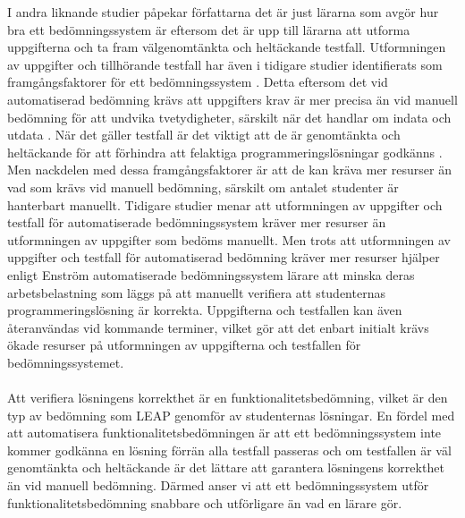 \documentclass[a4paper,11pt]{article}
\begin{document}
{I andra liknande studier \cite{pieterse} \cite{ala-mutka} \cite{enstrom} påpekar författarna det är just lärarna som avgör hur bra ett bedömningssystem är eftersom det är upp till lärarna att utforma uppgifterna och ta fram välgenomtänkta och heltäckande testfall. Utformningen av uppgifter och tillhörande testfall har även i tidigare studier identifierats som framgångsfaktorer för ett bedömningssystem \cite{hundley-britt-2009} \cite{pieterse}. Detta eftersom det vid automatiserad bedömning krävs att uppgifters krav är mer precisa än vid manuell bedömning för att undvika tvetydigheter, särskilt när det handlar om indata och utdata \cite{douce_11}. När det gäller testfall är det viktigt att de är genomtänkta och heltäckande för att förhindra att felaktiga programmeringslösningar godkänns \cite{montoya-dato-2009}. Men nackdelen med dessa framgångsfaktorer är att de kan kräva mer resurser än vad som krävs vid manuell bedömning, särskilt om antalet studenter är hanterbart manuellt. Tidigare studier \cite{ala-mutka} \cite{cinelli} menar att utformningen av uppgifter och testfall för automatiserade bedömningssystem kräver mer resurser än utformningen av uppgifter som bedöms manuellt. Men trots att utformningen av uppgifter och testfall för automatiserad bedömning kräver mer resurser hjälper enligt Enström \cite{enstrom} automatiserade bedömningssystem lärare att minska deras arbetsbelastning som läggs på att manuellt verifiera att studenternas programmeringslösning är korrekta. Uppgifterna och testfallen kan även återanvändas vid kommande terminer, vilket gör att det enbart initialt krävs ökade resurser på utformningen av uppgifterna och testfallen för bedömningssystemet.
\\
\\
Att verifiera lösningens korrekthet är en funktionalitetsbedömning, vilket är den typ av bedömning som LEAP genomför av studenternas lösningar. En fördel med att automatisera funktionalitetsbedömningen är att ett bedömningssystem inte kommer godkänna en lösning förrän alla testfall passeras och om testfallen är väl genomtänkta och heltäckande är det lättare att garantera lösningens korrekthet än vid manuell bedömning. Därmed anser vi att ett bedömningssystem utför funktionalitetsbedömning snabbare och utförligare än vad en lärare gör.
\\
\\
}
\end{document}
